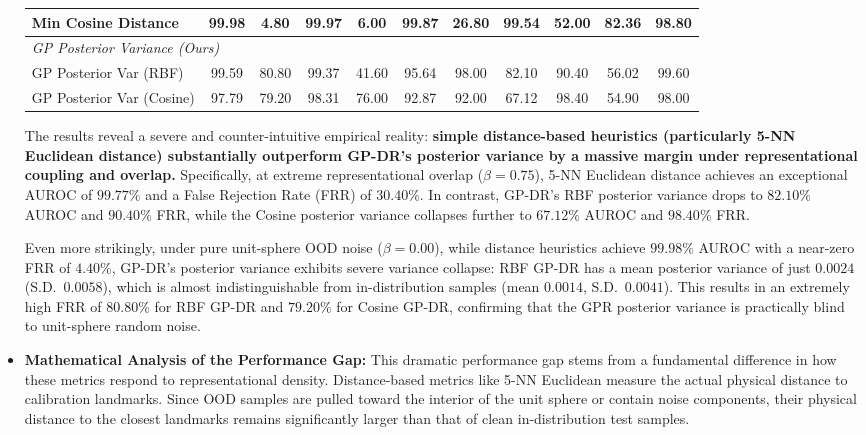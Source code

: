 \begin{itemize}
\begin{table}[t]
\begin{center}
\begin{small}
\begin{sc}
{\begin{tabular}{lcccccccccc}
Min Cosine Distance & 99.98 & 4.80 & 99.97 & 6.00 & 99.87 & 26.80 & 99.54 & 52.00 & 82.36 & 98.80 \\
\midrule
\multicolumn{11}{l}{\emph{GP Posterior Variance (Ours)}} \\
GP Posterior Var (RBF) & 99.59 & 80.80 & 99.37 & 41.60 & 95.64 & 98.00 & 82.10 & 90.40 & 56.02 & 99.60 \\
GP Posterior Var (Cosine) & 97.79 & 79.20 & 98.31 & 76.00 & 92.87 & 92.00 & 67.12 & 98.40 & 54.90 & 98.00 \\
\bottomrule
\end{tabular}%
}
\end{sc}
\end{small}
\end{center}
\vskip -0.1in
\end{table}

    The results reveal a severe and counter-intuitive empirical reality: \textbf{simple distance-based heuristics (particularly 5-NN Euclidean distance) substantially outperform GP-DR's posterior variance by a massive margin under representational coupling and overlap.} Specifically, at extreme representational overlap ($\beta = 0.75$), 5-NN Euclidean distance achieves an exceptional AUROC of $99.77\%$ and a False Rejection Rate (FRR) of $30.40\%$. In contrast, GP-DR's RBF posterior variance drops to $82.10\%$ AUROC and $90.40\%$ FRR, while the Cosine posterior variance collapses further to $67.12\%$ AUROC and $98.40\%$ FRR. 
    
    Even more strikingly, under pure unit-sphere OOD noise ($\beta = 0.00$), while distance heuristics achieve $99.98\%$ AUROC with a near-zero FRR of $4.40\%$, GP-DR's posterior variance exhibits severe variance collapse: RBF GP-DR has a mean posterior variance of just $0.0024$ (S.D.\ $0.0058$), which is almost indistinguishable from in-distribution samples (mean $0.0014$, S.D.\ $0.0041$). This results in an extremely high FRR of $80.80\%$ for RBF GP-DR and $79.20\%$ for Cosine GP-DR, confirming that the GPR posterior variance is practically blind to unit-sphere random noise.
    
    \item \textbf{Mathematical Analysis of the Performance Gap:} This dramatic performance gap stems from a fundamental difference in how these metrics respond to representational density. Distance-based metrics like 5-NN Euclidean measure the actual physical distance to calibration landmarks. Since OOD samples are pulled toward the interior of the unit sphere or contain noise components, their physical distance to the closest landmarks remains significantly larger than that of clean in-distribution test samples. 
    

\end{itemize}
